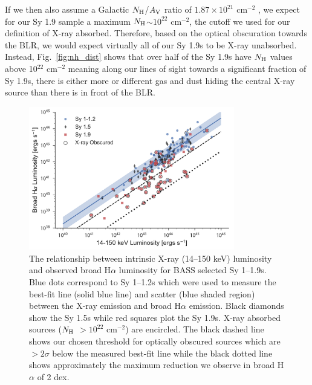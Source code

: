 \documentclass[twocolumn,trackchanges]{aastex6}
\newcommand{\halpha}{H$\alpha$}
\newcommand{\nh}{$N_{\rm H}$}
\begin{document}
If we then also assume a Galactic \nh/$A_{\rm V}$ ratio of $1.87\times10^{21}$ cm$^{-2}$ \citep{Draine:2011zr}, we expect for our Sy 1.9 sample a maximum \nh{}$\sim10^{22}$ cm$^{-2}$, the cutoff we used for our definition of X-ray absorbed. Therefore, based on the optical obscuration towards the BLR, we would expect virtually all of our Sy 1.9s to be X-ray unabsorbed. Instead, Fig.~\ref{fig:nh_dist} shows that over half of the Sy 1.9s have \nh{} values above 10$^{22}$ cm$^{-2}$ meaning along our lines of sight towards a significant fraction of Sy 1.9s, there is either more or different gas and dust hiding the central X-ray source than there is in front of the BLR.

\begin{figure}
\centering
\includegraphics[width=0.8\textwidth]{../figures/halpha_vs_xray_with2dexLine.pdf}
\caption{\label{fig:brha_xray} The relationship between intrinsic X-ray (14--150 keV) luminosity and observed broad \halpha{} luminosity for BASS selected Sy 1--1.9s. Blue dots correspond to Sy 1--1.2s which were used to measure the best-fit line (solid blue line) and scatter (blue shaded region) between the X-ray emission and broad \halpha{} emission. Black diamonds show the Sy 1.5s while red squares plot the Sy 1.9s. X-ray absorbed sources (\nh{} $>10^{22}$ cm$^{-2}$) are encircled. The black dashed line shows our chosen threshold for optically obscured sources which are $>2\sigma$ below the measured best-fit line while the black dotted line shows approximately the maximum reduction we observe in broad \halpha{} of 2 dex.}
\end{figure}
\end{document}
